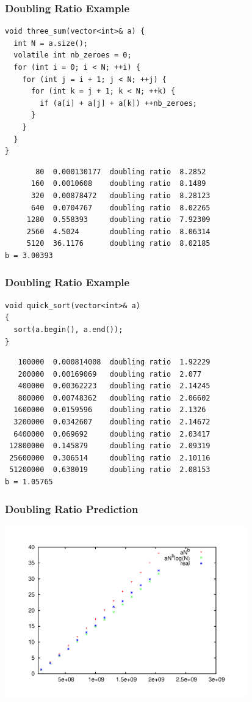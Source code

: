 \documentclass{beamer}
\begin{document}
\begin{frame}[containsverbatim]
\frametitle{Doubling Ratio Example}
\scriptsize
\begin{lstlisting}
void three_sum(vector<int>& a) {
  int N = a.size();
  volatile int nb_zeroes = 0;
  for (int i = 0; i < N; ++i) {
    for (int j = i + 1; j < N; ++j) {
      for (int k = j + 1; k < N; ++k) {
        if (a[i] + a[j] + a[k]) ++nb_zeroes;
      }
    }
  }
}
\end{lstlisting}

\begin{verbatim}
       80  0.000130177  doubling ratio  8.2852
      160  0.0010608    doubling ratio  8.1489
      320  0.00878472   doubling ratio  8.28123
      640  0.0704767    doubling ratio  8.02265
     1280  0.558393     doubling ratio  7.92309
     2560  4.5024       doubling ratio  8.06314
     5120  36.1176      doubling ratio  8.02185
b = 3.00393
\end{verbatim}

\end{frame}

\begin{frame}[containsverbatim]
\frametitle{Doubling Ratio Example}
\scriptsize
\begin{lstlisting}
void quick_sort(vector<int>& a)
{
  sort(a.begin(), a.end());
}
\end{lstlisting}

\begin{verbatim}
   100000  0.000814008  doubling ratio  1.92229
   200000  0.00169069   doubling ratio  2.077
   400000  0.00362223   doubling ratio  2.14245
   800000  0.00748362   doubling ratio  2.06602
  1600000  0.0159596    doubling ratio  2.1326
  3200000  0.0342607    doubling ratio  2.14672
  6400000  0.069692     doubling ratio  2.03417
 12800000  0.145879     doubling ratio  2.09319
 25600000  0.306514     doubling ratio  2.10116
 51200000  0.638019     doubling ratio  2.08153
b = 1.05765
\end{verbatim}

\end{frame}

\begin{frame}[containsverbatim]
\frametitle{Doubling Ratio Prediction}

\begin{center}
\includegraphics[width=10.5cm]{model.pdf}
\end{center}

\end{frame}
\end{document}
